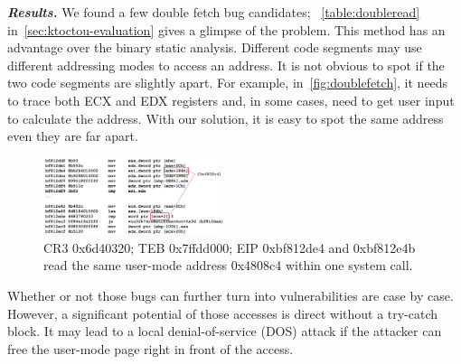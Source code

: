 \textbf{\textit{Results.}} We found a few double fetch bug candidates; ~\autoref{table:doubleread} in~\autoref{sec:ktoctou-evaluation} gives a glimpse of the problem. This method has an advantage over the binary static analysis. Different code segments may use different addressing modes to access an address.  It is not obvious to spot if the two code segments are slightly apart. For example, in~\autoref{fig:doublefetch}, it needs to trace both ECX and EDX registers and, in some cases, need to get user input to calculate the address. With our solution, it is easy to spot the same address even they are far apart. 


\begin{figure}[th]
  \includegraphics[width=0.47\textwidth]{figures/doublefetch}
  \centering
  \caption{CR3 0x6d40320; TEB 0x7ffdd000; EIP 0xbf812de4 and 0xbf812e4b read the same user-mode address 0x4808c4 within one system call.}
  \label{fig:doublefetch}
\end{figure}


Whether or not those bugs can further turn into vulnerabilities are case by case. However, a significant potential of those accesses is direct without a try-catch block. It may lead to a local denial-of-service (DOS) attack if the attacker can free the user-mode page right in front of the access. 
